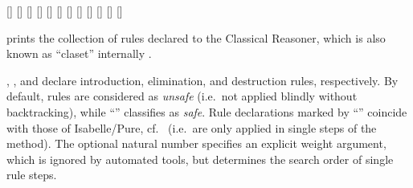 \begin{isabellebody}
\begin{isamarkuptext}
  \begin{railoutput}
\rail@bar
{}[]
[]
[]
\rail@endbar
\rail@bar
{}[]
[]
\rail@endbar
\rail@bar
{}
[]
\rail@endbar
\rail@end
{}
[]
[]
\rail@end
{}
[]
\rail@bar
\rail@bar
{}
[]
\rail@endbar
\rail@bar
{}
[]
\rail@endbar
{}
[]
\rail@endbar
\rail@end
\end{railoutput}


  \begin{description}

  \item \hyperlink{command.print-claset}{\mbox{}} prints the collection of rules
  declared to the Classical Reasoner, which is also known as
  ``claset'' internally \cite{isabelle-ref}.
  
  \item \hyperlink{attribute.intro}{\mbox{}}, \hyperlink{attribute.elim}{\mbox{}}, and \hyperlink{attribute.dest}{\mbox{}}
  declare introduction, elimination, and destruction rules,
  respectively.  By default, rules are considered as \emph{unsafe}
  (i.e.\ not applied blindly without backtracking), while ``'' classifies as \emph{safe}.  Rule declarations marked by
  ``'' coincide with those of Isabelle/Pure, cf.\
   (i.e.\ are only applied in single steps
  of the \hyperlink{method.rule}{\mbox{\isa{rule}}} method).  The optional natural number
  specifies an explicit weight argument, which is ignored by automated
  tools, but determines the search order of single rule steps.


\end{description}
\end{isamarkuptext}
\end{isabellebody}
